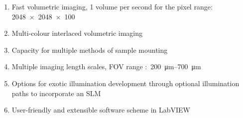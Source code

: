 \begin{enumerate}
    \item Fast volumetric imaging, 1 volume per second for the pixel range:\\\SI{2048x2048x100}{}\label{item:volumes}
    \item Multi-colour interlaced volumetric imaging  \label{item:colour}
    \item Capacity for multiple methods of sample mounting \label{item:mounting}
    \item Multiple imaging length scales, \gls{FOV} range :~\SIrange{200}{700}{\micro\meter} \label{item:scales}%
    \item Options for exotic illumination development through optional illumination paths to incorporate an \gls{SLM} \label{item:illumination}
    \item User-friendly and extensible software scheme in \gls{LabVIEW} \label{item:software}
\end{enumerate}

%
%
%
%
%

